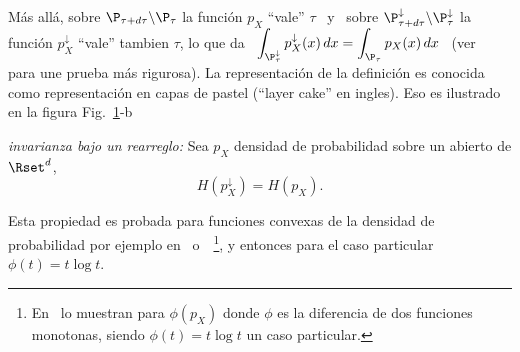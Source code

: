 M\'as  all\'a, sobre  $\P_{\tau+d\tau}  \backslash \P_\tau$  la funci\'on  $p_X$
``vale''   $\tau$   \   y   \   sobre   $\P_{\tau+d\tau}^\downarrow   \backslash
\P_\tau^\downarrow$  la funci\'on $p_X^\downarrow$  ``vale'' tambien  $\tau$, lo
que  da \  $\displaystyle  \int_{\P_\tau^\downarrow} p_X^\downarrow(x)  \, dx  =
\int_{\P_\tau} p_X(x)  \, dx$ \  (ver~\cite{LieLos01, WanMad04} para  une prueba
m\'as  rigurosa).   La representaci\'on  de  la  definici\'on  es conocida  como
representaci\'on  en  capas  de  pastel  (``layer cake''  en  ingles).   Eso  es
ilustrado en la figura Fig.~\ref{Fig:SZ:ensemblerearreglado}-b
  \begin{figure}[h!]
  \begin{center}  \end{center}
  \label{Fig:SZ:ensemblerearreglado}
  \end{figure}

\begin{propiedadesC}\setcounter{enumi}{\value{PropPermutacion}}
\item\label{Prop:SZ:permutacionC} {\it invarianza  bajo un rearreglo:} Sea $p_X$
  densidad de probabilidad sobre un abierto de $\Rset^d$,
  \[
  H\left( p_X^\downarrow \right) = H(p_X).
  \]
\end{propiedadesC}
%
\noindent Esta  propiedad es probada para  funciones convexas de  la densidad de
probabilidad              por             ejemplo             en~\cite{LieLos01}
o~\cite[Lema~7.2]{WanMad04}~\footnote{En~\cite[Sec.~3.3]{LieLos01}  lo  muestran
  para $\phi(p_X)$  donde $\phi$  es la diferencia  de dos  funciones monotonas,
  siendo $\phi(t)  = t  \log t$ un  caso particular.},  y entonces para  el caso
particular $\phi(t) = t \log t$.

